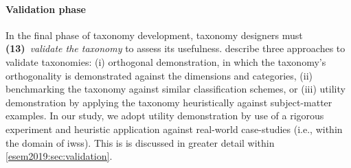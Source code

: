 \paragraph{Validation phase}  In the final phase of taxonomy development, taxonomy designers must \textbf{(13)}~\textit{validate the taxonomy} to assess its usefulness. \citet{Usman:2017hn} describe three approaches to validate taxonomies: (i) orthogonal demonstration, in which the taxonomy's orthogonality is demonstrated against the dimensions and categories, (ii) benchmarking the taxonomy against similar classification schemes, or (iii) utility demonstration by applying the taxonomy heuristically against subject-matter examples. In our study, we adopt utility demonstration by use of a rigorous experiment and heuristic application against real-world case-studies (i.e., within the domain of \glspl{iws}). This is is discussed in greater detail within \cref{esem2019:sec:validation}.


